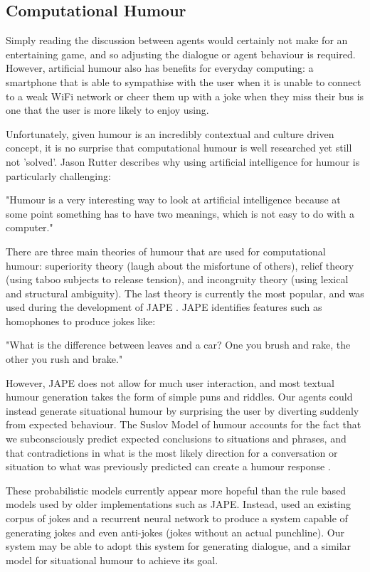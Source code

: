\documentclass[conference]{IEEEtran}
\begin{document}
\subsection{Computational Humour}

Simply reading the discussion between agents would certainly not make for an entertaining game, and so adjusting the dialogue or agent behaviour is required. However, artificial humour also has benefits for everyday computing: a smartphone that is able to sympathise with the user when it is unable to connect to a weak WiFi network or cheer them up with a joke when they miss their bus is one that the user is more likely to enjoy using. 

Unfortunately, given humour is an incredibly contextual and culture driven concept, it is no surprise that computational humour is well researched yet still not 'solved'. Jason Rutter describes why using artificial intelligence for humour is particularly challenging:

\begin{displayquote}
"Humour is a very interesting way to look at artificial intelligence because at some point something has to have two meanings, which is not easy to do with a computer." \cite{jasonrutter}
\end{displayquote}

There are three main theories of humour that are used for computational humour: superiority theory (laugh about the misfortune of others), relief theory (using taboo subjects to release tension), and incongruity theory (using lexical and structural ambiguity). The last theory is currently the most popular, and was used during the development of JAPE \cite{jape}. JAPE identifies features such as homophones to produce jokes like:

\begin{displayquote}
	"What is the difference between leaves and a car? One you brush and rake, the other you rush and brake."
\end{displayquote}

However, JAPE does not allow for much user interaction, and most textual humour generation takes the form of simple puns and riddles. Our agents could instead generate situational humour by surprising the user by diverting suddenly from expected behaviour. The Suslov Model of humour accounts for the fact that we subconsciously predict expected conclusions to situations and phrases, and that contradictions in what is the most likely direction for a conversation or situation to what was previously predicted can create a humour response \cite{suslov}.

These probabilistic models currently appear more hopeful than the rule based models used by older implementations such as JAPE. Instead, \cite{humourrnn} used an existing corpus of jokes and a recurrent neural network to produce a system capable of generating jokes and even anti-jokes (jokes without an actual punchline). Our system may be able to adopt this system for generating dialogue, and a similar model for situational humour to achieve its goal.




\vspace{12pt}
\end{document}

